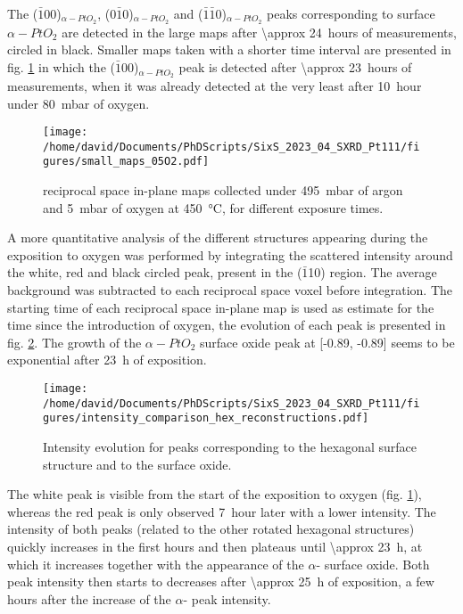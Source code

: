 The ($\bar{1}0$0)$_{\alpha-PtO_2}$, ($0\bar{1}$0)$_{\alpha-PtO_2}$ and ($\bar{1}\bar{1}$0)$_{\alpha-PtO_2}$ peaks corresponding to surface ${\alpha-PtO_2}$ are detected in the large maps after \qty{\approx 24}{hours} of measurements, circled in black.
Smaller maps taken with a shorter time interval are presented in fig. \ref{fig:SmallMapsPt111LowOxygen} in which the ($\bar{1}0$0)$_{\alpha-PtO_2}$ peak is detected after \qty{\approx 23}{hours} of measurements, when it was already detected at the very least after \qty{10}{hour} under \qty{80}{\milli\bar} of oxygen.

\begin{figure}[!htb]
    \centering
    \texttt{[image: /home/david/Documents/PhDScripts/SixS\_2023\_04\_SXRD\_Pt111/figures/small\_maps\_05O2.pdf]}
    \caption{
        reciprocal space in-plane maps collected under \qty{495}{\milli\bar} of argon and \qty{5}{\milli\bar} of oxygen at \qty{450}{\degreeCelsius}, for different exposure times.
    }
    \label{fig:SmallMapsPt111LowOxygen}
\end{figure}

A more quantitative analysis of the different structures appearing during the exposition to oxygen was performed by integrating the scattered intensity around the white, red and black circled peak, present in the ($\bar{1}$10) region.
The average background was subtracted to each reciprocal space voxel before integration.
The starting time of each reciprocal space in-plane map is used as estimate for the time since the introduction of oxygen, the evolution of each peak is presented in fig. \ref{fig:HexBraggPeaks}.
The growth of the ${\alpha-PtO_2}$ surface oxide peak at [-0.89, -0.89] seems to be exponential after \qty{23}{\hour} of exposition.

\begin{figure}[!htb]
    \centering
    \texttt{[image: /home/david/Documents/PhDScripts/SixS\_2023\_04\_SXRD\_Pt111/figures/intensity\_comparison\_hex\_reconstructions.pdf]}
    \caption{
        Intensity evolution for peaks corresponding to the hexagonal surface structure and to the surface oxide.
    }
    \label{fig:HexBraggPeaks}
\end{figure}

The white peak is visible from the start of the exposition to oxygen (fig. \ref{fig:SmallMapsPt111LowOxygen}), whereas the red peak is only observed \qty{7}{hour} later with a lower intensity.
The intensity of both peaks (related to the other rotated hexagonal structures) quickly increases in the first hours and then plateaus until \qty{\approx 23}{\hour}, at which it increases together with the appearance of the $\alpha$- surface oxide.
Both peak intensity then starts to decreases after \qty{\approx 25}{\hour} of exposition, a few hours after the increase of the $\alpha$- peak intensity.

